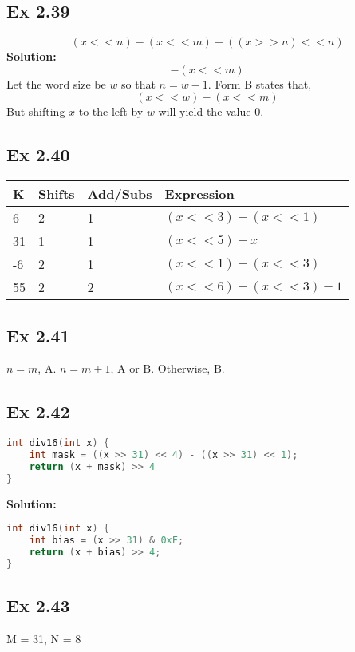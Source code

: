 \subsection{Ex 2.39}
$$
(x << n) - (x << m) + ((x >> n) << n)
$$
{\color{red}\textbf{Solution: }
$$-(x<<m)$$
Let the word size be $w$ so that $n = w - 1$. Form B states that,
$$(x<<w) - (x<<m)$$ But shifting $x$ to the left by $w$ will yield the value 0.
}
\subsection{Ex 2.40}
\begin{table}[h]
    \centering
    \begin{tabular}{llll}
        \toprule
        K & Shifts & Add/Subs & Expression\\
        \midrule
        6 & 2 & 1 & $(x << 3) - (x << 1)$\\
        31 & 1 & 1 & $(x << 5) - x$\\
        -6 & 2 & 1 & $(x << 1) - (x << 3)$\\
        55 & 2 & 2 & $(x << 6) - (x << 3) - 1$\\
        \bottomrule
    \end{tabular}
\end{table}

\subsection{Ex 2.41}
$n = m$, A. $n = m + 1$, A or B. Otherwise, B.

\subsection{Ex 2.42}
\begin{lstlisting}[language=C]
int div16(int x) {
    int mask = ((x >> 31) << 4) - ((x >> 31) << 1);
    return (x + mask) >> 4
}
\end{lstlisting}
{\color{blue}\textbf{Solution: }
\begin{lstlisting}[language=C]
int div16(int x) {
    int bias = (x >> 31) & 0xF;
    return (x + bias) >> 4;
}
\end{lstlisting}
}

\subsection{Ex 2.43}
M = 31, N = 8


